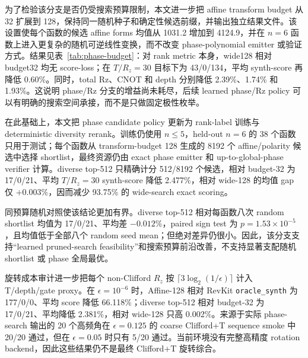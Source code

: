 \documentclass[UTF8,fontset=fandol,11pt]{ctexart}
\newcommand{\rz}{\ensuremath{R_z}}
\begin{document}
\begin{table}[H]
\centering
\small
\caption{Affine-FPRM phase-parity search 的配对比较。}
\label{tab:phase}

\end{table}

为了检验该分支是否仍受搜索预算限制，本文进一步把 affine transform budget 从 32 扩展到 128，保持同一随机种子和确定性候选前缀，并输出独立结果文件。该设置使每个函数的候选 affine forms 均值从 1031.2 增加到 4124.9，并在 $n=6$ 函数上进入更复杂的随机可逆线性变换，而不改变 phase-polynomial emitter 或验证方式。结果见表~\ref{tab:phase-budget}：对 rank metric 本身，wide128 相对 budget32 均无 score-loss；在 $T/R_z=30$ 目标下为 43/0/134，平均 synth-score 再降低 0.60\%。同时，total Rz、CNOT 和 depth 分别降低 2.39\%、1.74\% 和 1.93\%。这说明 phase/Rz 分支的增益尚未耗尽，后续 learned phase/Rz policy 可以有明确的搜索空间承接，而不是只做固定极性枚举。

\begin{table}[H]
\centering
\small
\caption{Affine-FPRM phase search 的预算扩展结果。比较对象为 transform-budget 128 相对 transform-budget 32 的同名 selected rows；负值表示 budget 128 更低。}
\label{tab:phase-budget}

\end{table}

在此基础上，本文把 phase candidate policy 更新为 rank-label 训练与 deterministic diversity rerank。训练仍使用 $n\leq5$，held-out $n=6$ 的 38 个函数只用于测试；每个函数从 transform-budget 128 生成的 8192 个 affine/polarity 候选中选择 shortlist，最终资源仍由 exact phase emitter 和 up-to-global-phase verifier 计算。diverse top-512 只精确计分 512/8192 个候选，相对 budget-32 为 17/0/21、平均 $T/R_z=30$ synth-score 降低 2.477\%，相对 wide-128 的均值 gap 仅 $+0.003\%$，因而减少 93.75\% 的 wide-search exact scoring。

同预算随机对照使该结论更加有界。diverse top-512 相对每函数八次 random shortlist 均值为 17/0/21、平均差 $-0.012\%$，paired sign test 为 $p=1.53\times10^{-5}$，且均值低于全部八个 random seed mean；但绝对差异仍很小。因此，该分支支持“learned pruned-search feasibility”和搜索预算前沿改善，不支持显著支配随机 shortlist 或 phase 全局最优。

旋转成本审计进一步把每个 non-Clifford \rz{} 按 $\lceil3\log_2(1/\epsilon)\rceil$ 计入 T/depth/gate proxy。在 $\epsilon=10^{-6}$ 时，Affine-128 相对 RevKit \texttt{oracle\_synth} 为 177/0/0、平均 score 降低 66.118\%；diverse top-512 相对 budget-32 为 17/0/21、平均降低 2.381\%，相对 wide-128 只高 0.002\%。来源于实际 phase-search 输出的 20 个高频角在 $\epsilon=0.125$ 的 coarse Clifford+T sequence smoke 中 20/20 通过，但在 $\epsilon=0.05$ 时只有 5/20 通过。当前环境没有完整高精度 rotation backend，因此这些结果仍不是最终 Clifford+T 旋转综合。
\end{document}
